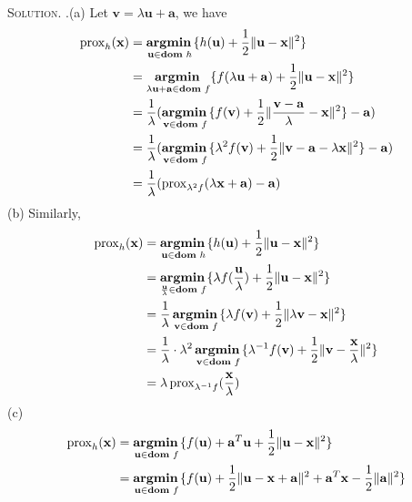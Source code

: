 \documentclass[12pt, a4paper, oneside]{ctexart}
\newenvironment{solution}{\par\noindent\textsc{Solution. }}{\\\par}
\DeclareMathOperator*{\argmin}{\bf argmin\,}
\DeclareMathOperator*{\dom}{\bf dom\,}
\begin{document}
\begin{solution}
    \newline{}.(a) Let $\mathbf{v} = \lambda \mathbf{u} + \mathbf{a}$, we have
    \begin{align*}
    	\operatorname{prox}_h (\mathbf{x}) & = \argmin_{\mathbf{u} \in \dom h} \{h(\mathbf{u}) + \frac{1}{2} \|\mathbf{u} - \mathbf{x}\|^2\} \\
    	& = \argmin_{\lambda \mathbf{u} + \mathbf{a} \in \dom f} \{f(\lambda \mathbf{u} + \mathbf{a}) + \frac{1}{2} \| \mathbf{u} - \mathbf{x} \|^2\} \\
    	& = \frac{1}{\lambda} (\argmin_{\mathbf{v} \in \dom f} \{f(\mathbf{v}) + \frac{1}{2} \|\frac{\mathbf{v} - \mathbf{a}}{\lambda} - \mathbf{x}\|^2\} - \mathbf{a}) \\
    	& = \frac{1}{\lambda} (\argmin_{\mathbf{v} \in \dom f} \{\lambda^2 f(\mathbf{v}) + \frac{1}{2} \|\mathbf{v} - \mathbf{a} - \lambda \mathbf{x}\|^2\} - \mathbf{a}) \\
    	& = \frac{1}{\lambda} (\operatorname{prox}_{\lambda^2 f} (\lambda \mathbf{x} + \mathbf{a}) - \mathbf{a})
    \end{align*}
    \newline
    (b) Similarly,
    \begin{align*}
        \operatorname{prox}_h (\mathbf{x}) & = \argmin_{\mathbf{u} \in \dom h} \{h(\mathbf{u}) + \frac{1}{2} \|\mathbf{u} - \mathbf{x}\|^2\} \\
        & = \argmin_{\frac{\mathbf{u}}{\lambda} \in \dom f} \{\lambda f(\frac{\mathbf{u}}{\lambda}) + \frac{1}{2} \|\mathbf{u} - \mathbf{x}\|^2\} \\
        & = \frac{1}{\lambda} \argmin_{\mathbf{v} \in \dom f} \{\lambda f(\mathbf{v}) + \frac{1}{2} \|\lambda \mathbf{v} - \mathbf{x}\|^2\} \\
        & = \frac{1}{\lambda} \cdot \lambda^2 \argmin_{\mathbf{v} \in \dom f} \{\lambda^{-1} f(\mathbf{v}) + \frac{1}{2} \|\mathbf{v} - \frac{\mathbf{x}}{\lambda}\|^2\} \\
        & = \lambda \operatorname{prox}_{\lambda^{-1} f} (\frac{\mathbf{x}}{\lambda})
    \end{align*}
    \newline
    (c) 
    \begin{align*}
        \operatorname{prox}_h (\mathbf{x}) & = \argmin_{\mathbf{u} \in \dom f} \{ f(\mathbf{u}) + \mathbf{a}^T\mathbf{u} + \frac{1}{2} \|\mathbf{u} - \mathbf{x}\|^2\} \\
        & = \argmin_{\mathbf{u} \in \dom f} \{f(\mathbf{u}) + \frac{1}{2} \|\mathbf{u - x + a}\|^2 + \mathbf{a}^T\mathbf{x} - \frac{1}{2}\|\mathbf{a}\|^2\} \\

\end{align*}
\end{solution}
\end{document}
